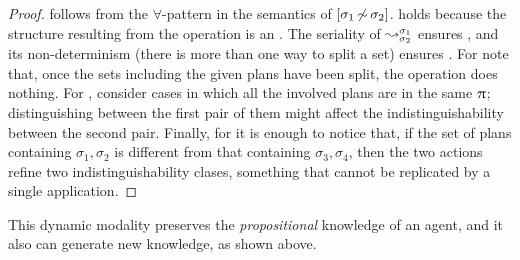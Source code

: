 \begin{textonuevo}
\begin{proof}
 follows from the $\forall$-pattern in the semantics of $[{\sigma_1{\,\not\sim\,}\sigma_2}]$.
 holds because the structure resulting from the operation is an \ults.
The seriality of $\leadsto^{\sigma_1}_{\sigma_2}$ ensures , and its non-determinism (there is more than one way to split a set) ensures .
For  note that, once the sets including the given plans have been split, the operation does nothing.%
For , consider cases in which all the involved plans are in the same $\uppi$; distinguishing between the first pair of them might affect the indistinguishability between the second pair.%
Finally, for  it is enough to notice that, if the set of plans containing $\sigma_1, \sigma_2$ is different from that containing $\sigma_3, \sigma_4$, then the two actions refine two indistinguishability clases, something that cannot be replicated by a single application.
\end{proof}
\end{textonuevo}

This dynamic modality preserves the \emph{propositional} knowledge of an agent, and it also can generate new knowledge, as shown above.

\medskip

